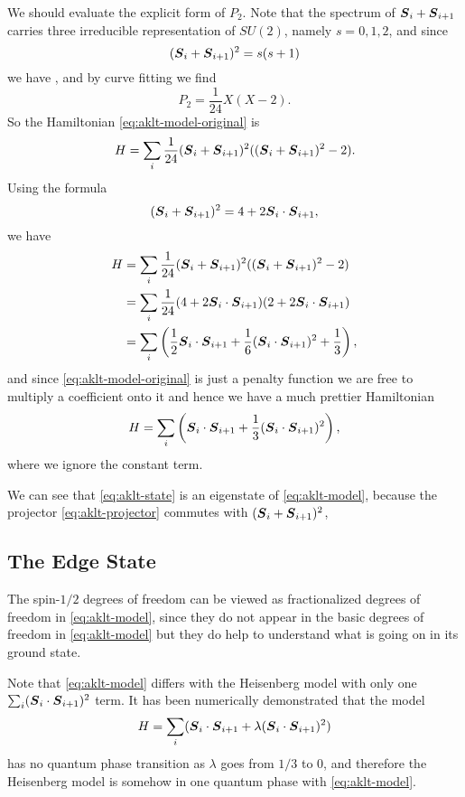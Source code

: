 \documentclass[hyperref, a4paper]{article}
\begin{document}
We should evaluate the explicit form of $P_2$. Note that the spectrum of $\vb*{S}_i + \vb*{S}_{i+1}$ carries three irreducible representation of $SU(2)$, namely $s = 0, 1, 2$, and since 
\[
    (\vb*{S}_i + \vb*{S}_{i+1})^2 = s(s+1)
\]
we have , and by curve fitting we find 
\[
    P_2 = \frac{1}{24} X (X-2).
\]
So the Hamiltonian \eqref{eq:aklt-model-original} is 
\begin{equation}
    H = \sum_i \frac{1}{24} (\vb*{S}_i + \vb*{S}_{i+1})^2 ((\vb*{S}_i + \vb*{S}_{i+1})^2 -2).
\end{equation}
Using the formula
\[
    (\vb*{S}_i + \vb*{S}_{i+1})^2 = 4 + 2 \vb*{S}_i \cdot \vb*{S}_{i+1},
\]
we have 
\[
    \begin{aligned}
        H &= \sum_i \frac{1}{24} (\vb*{S}_i + \vb*{S}_{i+1})^2 ((\vb*{S}_i + \vb*{S}_{i+1})^2 -2) \\
        &= \sum_i \frac{1}{24} (4 + 2 \vb*{S}_i \cdot \vb*{S}_{i+1}) (2 + 2 \vb*{S}_i \cdot \vb*{S}_{i+1}) \\
        &= \sum_i \left( \frac{1}{2} \vb*{S}_i \cdot \vb*{S}_{i+1} + \frac{1}{6} (\vb*{S}_i \cdot \vb*{S}_{i+1})^2 + \frac{1}{3} \right),
    \end{aligned}
\]
and since \eqref{eq:aklt-model-original} is just a penalty function we are free to multiply a coefficient onto it and hence we have a much prettier Hamiltonian
\begin{equation}
    H = \sum_i \left( \vb*{S}_{i} \cdot \vb*{S}_{i+1} + \frac{1}{3} (\vb*{S}_i \cdot \vb*{S}_{i+1})^2 \right),
    \label{eq:aklt-model}
\end{equation}
where we ignore the constant term. 

We can see that \eqref{eq:aklt-state} is an eigenstate of \eqref{eq:aklt-model}, because the projector \eqref{eq:aklt-projector} commutes with $(\vb*{S}_i + \vb*{S}_{i+1})^2$, 

\subsection{The Edge State}

The spin-$1/2$ degrees of freedom can be viewed as fractionalized degrees of freedom in \eqref{eq:aklt-model}, since they do not appear in the basic degrees of freedom in \eqref{eq:aklt-model} but they do help to understand what is going on in its ground state.

Note that \eqref{eq:aklt-model} differs with the Heisenberg model with only one $\sum_i (\vb*{S}_i \cdot \vb*{S}_{i+1})^2$ term. 
It has been numerically demonstrated that the model
\begin{equation}
    H = \sum_i (\vb*{S}_{i} \cdot \vb*{S}_{i+1} + \lambda (\vb*{S}_i \cdot \vb*{S}_{i+1})^2)
\end{equation}
has no quantum phase transition as $\lambda$ goes from $1/3$ to $0$, and therefore the Heisenberg model is somehow in one quantum phase with \eqref{eq:aklt-model}. 
\end{document}
